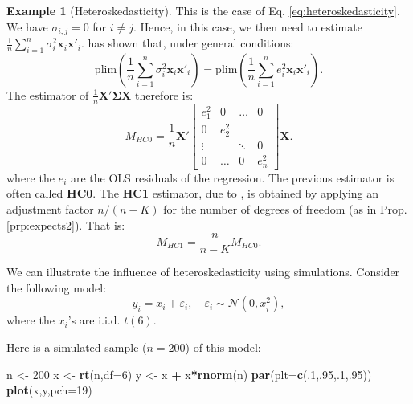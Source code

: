 \documentclass[
  12pt,
]{book}
\newenvironment{Shaded}{\begin{snugshade}}{\end{snugshade}}
\newcommand{\AttributeTok}[1]{\textcolor[rgb]{0.13,0.29,0.53}{#1}}
\newcommand{\DecValTok}[1]{\textcolor[rgb]{0.00,0.00,0.81}{#1}}
\newcommand{\FunctionTok}[1]{\textcolor[rgb]{0.13,0.29,0.53}{\textbf{#1}}}
\newcommand{\NormalTok}[1]{#1}
\newcommand{\OtherTok}[1]{\textcolor[rgb]{0.56,0.35,0.01}{#1}}
\newcommand{\SpecialCharTok}[1]{\textcolor[rgb]{0.81,0.36,0.00}{\textbf{#1}}}
\theoremstyle{definition}
\theoremstyle{definition}
\newtheorem{example}{Example}[chapter]
\theoremstyle{definition}
\theoremstyle{definition}
\theoremstyle{remark}
\begin{document}
\begin{example}[Heteroskedasticity]
\protect\hypertarget{exm:HCheteroskedasticity}{}\label{exm:HCheteroskedasticity}This is the case of Eq. \eqref{eq:heteroskedasticity}. We have \(\sigma_{i,j}=0\) for \(i \ne j\). Hence, in this case, we then need to estimate \(\frac{1}{n}\sum_{i=1}^{n}\sigma_{i}^2\mathbf{x}_i\mathbf{x}'_i\). \citet{White_1980} has shown that, under general conditions:
\begin{equation}
\mbox{plim}\left( \frac{1}{n}\sum_{i=1}^{n}\sigma_{i}^2\mathbf{x}_i\mathbf{x}'_i \right) = 
\mbox{plim}\left( \frac{1}{n}\sum_{i=1}^{n}e_{i}^2\mathbf{x}_i\mathbf{x}'_i \right). \label{eq:white}
\end{equation}
The estimator of \(\frac{1}{n}\mathbf{X}'\boldsymbol\Sigma\mathbf{X}\) therefore is:
\begin{equation}
M_{HC0} = \frac{1}{n}\mathbf{X}'
\left[
\begin{array}{cccc}
e_1^2 & 0 & \dots & 0 \\
0 & e_2^2 &  \\
\vdots & & \ddots&0 \\
0 & \dots & 0 & e_n^2
\end{array}
\right]
\mathbf{X}.\label{eq:White}
\end{equation}
where the \(e_i\) are the OLS residuals of the regression. The previous estimator is often called \textbf{HC0}. The \textbf{HC1} estimator, due to \citet{MacKinnon_White_1985}, is obtained by applying an adjustment factor \(n/(n-K)\) for the number of degrees of freedom (as in Prop. \ref{prp:expects2}). That is:
\begin{equation}
M_{HC1} = \frac{n}{n-K}M_{HC0}.\label{eq:WhiteHC1}
\end{equation}

We can illustrate the influence of heteroskedasticity using simulations. Consider the following model:
\[
y_i = x_i + \varepsilon_i, \quad \varepsilon_i \sim \mathcal{N}(0,x_i^2),
\]
where the \(x_i\)'s are i.i.d. \(t(6)\).

Here is a simulated sample (\(n=200\)) of this model:

\begin{Shaded}
\begin{Highlighting}[]
\NormalTok{n }\OtherTok{\textless{}{-}} \DecValTok{200}
\NormalTok{x }\OtherTok{\textless{}{-}} \FunctionTok{rt}\NormalTok{(n,}\AttributeTok{df=}\DecValTok{6}\NormalTok{)}
\NormalTok{y }\OtherTok{\textless{}{-}}\NormalTok{ x }\SpecialCharTok{+}\NormalTok{ x}\SpecialCharTok{*}\FunctionTok{rnorm}\NormalTok{(n)}
\FunctionTok{par}\NormalTok{(}\AttributeTok{plt=}\FunctionTok{c}\NormalTok{(.}\DecValTok{1}\NormalTok{,.}\DecValTok{95}\NormalTok{,.}\DecValTok{1}\NormalTok{,.}\DecValTok{95}\NormalTok{))}
\FunctionTok{plot}\NormalTok{(x,y,}\AttributeTok{pch=}\DecValTok{19}\NormalTok{)}
\end{Highlighting}
\end{Shaded}


\end{example}
\end{document}
